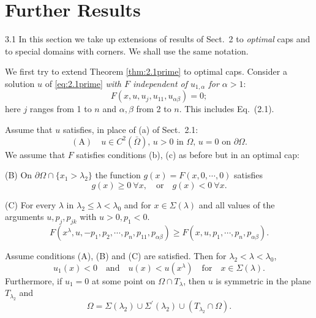 \section{Further Results}\label{sec:3}
	
3.1 In this section we take up extensions of results of Sect.~2 to \textit{optimal} caps 
and to special domains with corners. We shall use the same notation.

We first try to extend Theorem \ref{thm:2.1prime} to optimal caps. 
Consider a solution $u$ of \eqref{eq:2.1prime}
\textit{with $F$ independent of $u_{1,\alpha}$ for $\alpha>1$}:
\begin{equation}\label{eq:3.1}
  F(x,u,u_j,u_{11},u_{\alpha\beta})=0;
\end{equation}
here $j$ ranges from 1 to $n$ and $\alpha,\beta$ from 2 to $n$. This includes Eq.~(2.1).

Assume that $u$ satisfies, in place of (a) of Sect.~2.1:
\[\mathrm{(A)}\quad \text{$u\in C^2(\bar{\Omega})$, $u>0$ in $\Omega$, $u=0$ on $\partial\Omega$.}\]
We assume that $F$ satisfies conditions (b), (c) as before but in an optimal cap: 

(B)  On $\partial\Omega\cap\{x_1>\lambda_2\}$ the function $g(x)=F(x,0,\cdots,0)$ satisfies
\[g(x)\geq 0\ \forall x,\quad\text{or}\quad g(x)<0\ \forall x.\]

(C)  For every $\lambda$ in $\lambda_2\leq \lambda<\lambda_0$ and for $x\in\Sigma(\lambda)$ and all values of the arguments $u,p_j,p_{jk}$ with $u>0,p_1<0$.
\begin{equation}\label{eq:3.2}
  F(x^{\lambda},u,-p_1,p_2,\cdots,p_n,p_{11},p_{\alpha\beta})\geq  F(x,u,p_1,\cdots,p_n,p_{\alpha\beta}).
\end{equation}

\begin{theorem}\label{thm:3.1}
  Assume conditions \textrm{(A)}, \textrm{(B)} and \textrm{(C)} are satisfied.
  Then for $\lambda_2<\lambda<\lambda_0$,
  \begin{equation}\label{eq:3.3}
    u_1(x)<0\quad\text{and}\quad u(x)<u(x^{\lambda})\quad\text{for}\quad x\in\Sigma(\lambda).
  \end{equation}
  Furthermore, if $u_1 =0$ at some point on $\Omega\cap T_{\lambda}$, then $u$ is symmetric in the plane $T_{\lambda_2}$ and
  \begin{equation}\label{eq:3.4}
    \Omega=\Sigma(\lambda_2)\cup\Sigma^{\prime}(\lambda_2)\cup(T_{\lambda_2}\cap\Omega).
  \end{equation}
\end{theorem}

